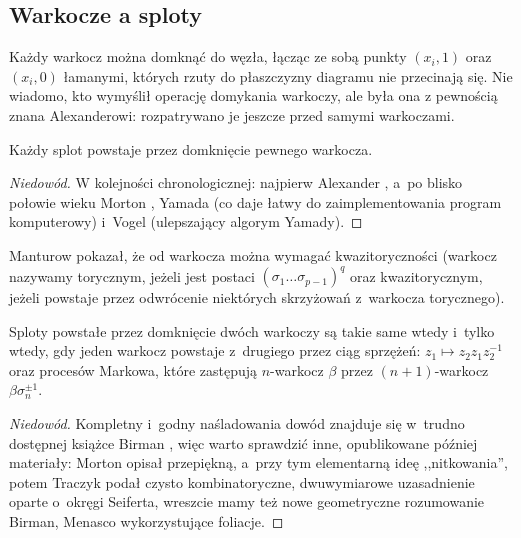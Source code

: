 
\subsection{Warkocze a sploty}
Każdy warkocz można domknąć do węzła, łącząc ze sobą punkty $(x_i, 1)$ oraz $(x_i, 0)$ łamanymi, których rzuty do płaszczyzny diagramu nie przecinają się.
%
Nie wiadomo, kto wymyślił operację domykania warkoczy, ale była ona z pewnością znana Alexanderowi: rozpatrywano je jeszcze przed samymi warkoczami.
%

\begin{theorem}[Alexander, 1923]
%
\label{thm:alexander}%
    Każdy splot powstaje przez domknięcie pewnego warkocza.
\end{theorem}

\begin{proof}[Niedowód]
    W kolejności chronologicznej:
    najpierw Alexander \cite{alexander23},
%
    a~po blisko połowie wieku Morton \cite{mortonhr86},
%
    Yamada \cite{yamada87} (co daje łatwy do zaimplementowania program komputerowy)
%
    i~Vogel \cite{vogel90} (ulepszający algorym Yamady).
%
\end{proof}

Manturow \cite{manturov02} pokazał, że od warkocza można wymagać kwazitoryczności (warkocz nazywamy torycznym, jeżeli jest postaci $(\sigma_1 \ldots \sigma_{p-1})^q$ oraz kwazitorycznym, jeżeli powstaje przez odwrócenie niektórych skrzyżowań z~warkocza torycznego).
%
%
%

\begin{theorem}[Markow, 1936]
%
    Sploty powstałe przez domknięcie dwóch warkoczy są takie same wtedy i~tylko wtedy, gdy jeden warkocz powstaje z~drugiego przez ciąg sprzężeń: $z_1 \mapsto z_2 z_1 z_2^{-1}$ oraz procesów Markowa, które zastępują $n$-warkocz $\beta$ przez $(n+1)$-warkocz $\beta\sigma_n^{\pm 1}$.
\end{theorem}

\begin{proof}[Niedowód]
    Kompletny i~godny naśladowania dowód znajduje się w~trudno dostępnej książce Birman \cite{birman74}, więc warto sprawdzić inne, opublikowane później materiały:
%
    Morton \cite{mortonhr86} opisał przepiękną, a~przy tym elementarną ideę ,,nitkowania'',
%
    potem Traczyk \cite{traczyk98} podał czysto kombinatoryczne, dwuwymiarowe uzasadnienie oparte o~okręgi Seiferta,
%
    wreszcie mamy też nowe geometryczne rozumowanie Birman, Menasco \cite{birman02} wykorzystujące foliacje.
%
%
\end{proof}

